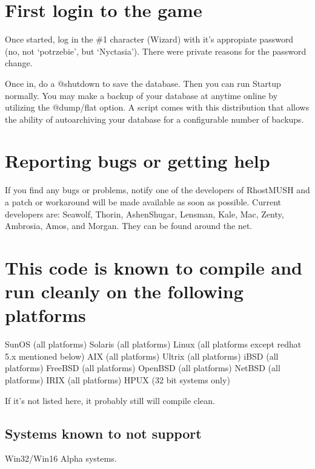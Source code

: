\documentclass[letterpaper,10pt,english]{sphinxmanual}
\begin{document}
\section{First login to the game}
\label{\detokenize{29-setup:first-login-to-the-game}}
\sphinxAtStartPar
Once started, log in the \#1 character (Wizard) with it’s appropiate
password (no, not ‘potrzebie’, but ‘Nyctasia’).  There were private
reasons for the password change.

\sphinxAtStartPar
Once in, do a @shutdown to save the database.  Then you can run Startup
normally.   You may make a backup of your database at anytime on\sphinxhyphen{}line by
utilizing the @dump/flat option.  A script comes with this distribution
that allows the ability of auto\sphinxhyphen{}archiving your database for a configurable
number of backups.


\section{Reporting bugs or getting help}
\label{\detokenize{29-setup:reporting-bugs-or-getting-help}}
\sphinxAtStartPar
If you find any bugs or problems, notify one of the developers of RhostMUSH and
a patch or workaround will be made available as soon as possible.  Current
developers are:  Seawolf, Thorin, Ashen\sphinxhyphen{}Shugar, Lensman, Kale, Mac, Zenty,
Ambrosia, Amos, and Morgan.  They can be found around the net.


\section{This code is known to compile and run cleanly on the following platforms}
\label{\detokenize{29-setup:this-code-is-known-to-compile-and-run-cleanly-on-the-following-platforms}}
\sphinxAtStartPar
SunOS (all platforms)
Solaris (all platforms)
Linux (all platforms except redhat 5.x mentioned below)
AIX (all platforms)
Ultrix (all platforms)
iBSD (all platforms)
FreeBSD (all platforms)
OpenBSD (all platforms)
NetBSD (all platforms)
IRIX (all platforms)
HPUX (32 bit systems only)

\sphinxAtStartPar
If it’s not listed here, it probably still will compile clean.


\subsection{Systems known to not support}
\label{\detokenize{29-setup:systems-known-to-not-support}}
\sphinxAtStartPar
Win32/Win16
Alpha systems.
\end{document}
